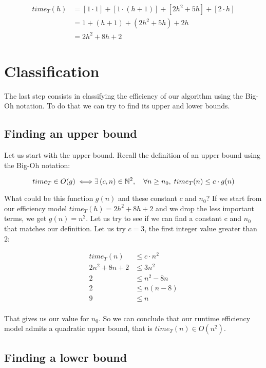 \documentclass[11pt]{article}
\begin{document}
\begin{align*}
time_T(h) &= [1 \cdot 1] + [1 \cdot (h + 1)] + [2h^2 + 5h] + [2 \cdot h] \\
          &= 1 + (h+1) + (2h^2 + 5h) + 2h \\
          &= 2h^2 + 8h + 2
\end{align*}

\section{Classification}
\label{sec:orgcd20c37}

The last step consists in classifying the efficiency of our
algorithm using the Big-Oh notation. To do that we can try to find its
upper and lower bounds.

\subsection{Finding an upper bound}
\label{sec:org89ad828}

Let us start with the upper bound. Recall the definition of an upper
bound using the Big-Oh notation:

\[
   time_T \in O(g) \iff \\
   \exists \, (c, n) \in \mathbb{N}^2, \quad \forall n \geq n_0, \; time_T(n) \leq c \cdot g(n)
   \]

What could be this function \(g(n)\) and these constant \(c\) and
\(n_0\)? If we start from our efficiency model \(time_T(h) = 2h^2 +
   8h + 2\) and we drop the less important terms, we get \(g(n) =
   n^2\). Let us try to see if we can find a constant c and \(n_0\) that
matches our definition. Let us try \(c=3\), the first integer value
greater than 2:

\begin{align*}
time_T(n) & \leq c \cdot n^2 \\
2n^2 + 8n + 2 & \leq 3n^2 \\
2 & \leq n^2 - 8n \\
2 & \leq n (n - 8) \\
9 & \leq n \\
\end{align*}

That gives us our value for \(n_0\). So we can conclude that our
runtime efficiency model admits a quadratic upper bound, that is
\(time_T(n) \in O(n^2)\).

\subsection{Finding a lower bound}
\label{sec:org8ede382}
\end{document}
